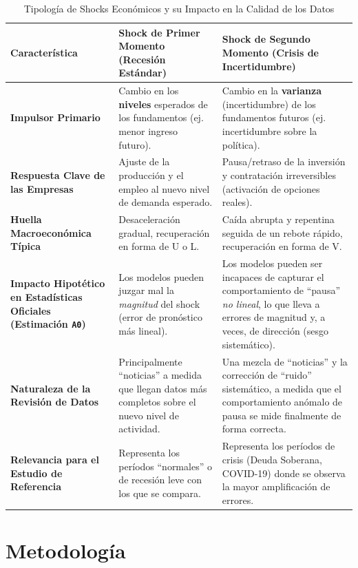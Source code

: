 \documentclass{article}
\begin{document}
\begin{table}[h!]
\centering
\caption{Tipología de Shocks Económicos y su Impacto en la Calidad de los Datos}
\label{tab:tipologia_shocks}
\begin{tabularx}{\textwidth}{|l|X|X|}
\hline
\textbf{Característica} & \textbf{Shock de Primer Momento (Recesión Estándar)} & \textbf{Shock de Segundo Momento (Crisis de Incertidumbre)} \\
\hline
\textbf{Impulsor Primario} & Cambio en los \textbf{niveles} esperados de los fundamentos (ej. menor ingreso futuro). & Cambio en la \textbf{varianza} (incertidumbre) de los fundamentos futuros (ej. incertidumbre sobre la política). \\
\hline
\textbf{Respuesta Clave de las Empresas} & Ajuste de la producción y el empleo al nuevo nivel de demanda esperado. & Pausa/retraso de la inversión y contratación irreversibles (activación de opciones reales). \\
\hline
\textbf{Huella Macroeconómica Típica} & Desaceleración gradual, recuperación en forma de U o L. & Caída abrupta y repentina seguida de un rebote rápido, recuperación en forma de V. \\
\hline
\textbf{Impacto Hipotético en Estadísticas Oficiales (Estimación \texttt{A0})} & Los modelos pueden juzgar mal la \textit{magnitud} del shock (error de pronóstico más lineal). & Los modelos pueden ser incapaces de capturar el comportamiento de ``pausa'' \textit{no lineal}, lo que lleva a errores de magnitud y, a veces, de dirección (sesgo sistemático). \\
\hline
\textbf{Naturaleza de la Revisión de Datos} & Principalmente ``noticias'' a medida que llegan datos más completos sobre el nuevo nivel de actividad. & Una mezcla de ``noticias'' y la corrección de ``ruido'' sistemático, a medida que el comportamiento anómalo de pausa se mide finalmente de forma correcta. \\
\hline
\textbf{Relevancia para el Estudio de Referencia} & Representa los períodos ``normales'' o de recesión leve con los que se compara. & Representa los períodos de crisis (Deuda Soberana, COVID-19) donde se observa la mayor amplificación de errores. \\
\hline
\end{tabularx}
\end{table}

\section{Metodología}
\end{document}
